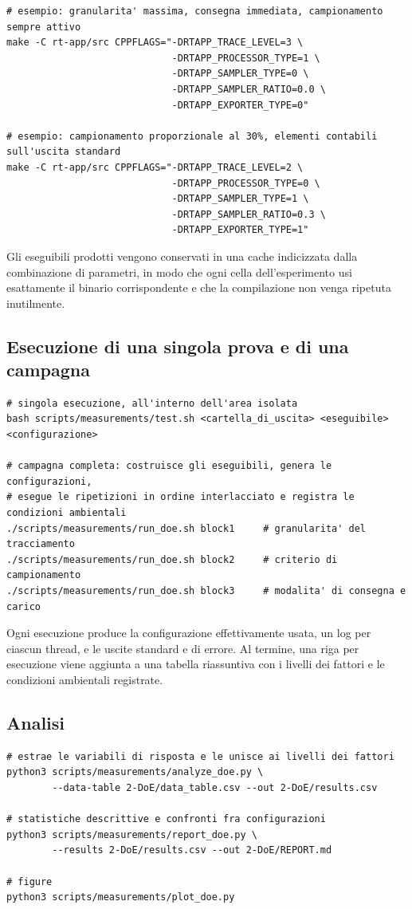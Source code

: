 \begin{lstlisting}
# esempio: granularita' massima, consegna immediata, campionamento sempre attivo
make -C rt-app/src CPPFLAGS="-DRTAPP_TRACE_LEVEL=3 \
                             -DRTAPP_PROCESSOR_TYPE=1 \
                             -DRTAPP_SAMPLER_TYPE=0 \
                             -DRTAPP_SAMPLER_RATIO=0.0 \
                             -DRTAPP_EXPORTER_TYPE=0"

# esempio: campionamento proporzionale al 30%, elementi contabili sull'uscita standard
make -C rt-app/src CPPFLAGS="-DRTAPP_TRACE_LEVEL=2 \
                             -DRTAPP_PROCESSOR_TYPE=0 \
                             -DRTAPP_SAMPLER_TYPE=1 \
                             -DRTAPP_SAMPLER_RATIO=0.3 \
                             -DRTAPP_EXPORTER_TYPE=1"
\end{lstlisting}

Gli eseguibili prodotti vengono conservati in una cache indicizzata dalla combinazione di
parametri, in modo che ogni cella dell'esperimento usi esattamente il binario corrispondente e che
la compilazione non venga ripetuta inutilmente.

\subsection{Esecuzione di una singola prova e di una campagna}

\begin{lstlisting}
# singola esecuzione, all'interno dell'area isolata
bash scripts/measurements/test.sh <cartella_di_uscita> <eseguibile> <configurazione>

# campagna completa: costruisce gli eseguibili, genera le configurazioni,
# esegue le ripetizioni in ordine interlacciato e registra le condizioni ambientali
./scripts/measurements/run_doe.sh block1     # granularita' del tracciamento
./scripts/measurements/run_doe.sh block2     # criterio di campionamento
./scripts/measurements/run_doe.sh block3     # modalita' di consegna e carico
\end{lstlisting}

Ogni esecuzione produce la configurazione effettivamente usata, un log per ciascun thread, e le
uscite standard e di errore. Al termine, una riga per esecuzione viene aggiunta a una tabella
riassuntiva con i livelli dei fattori e le condizioni ambientali registrate.

\subsection{Analisi}

\begin{lstlisting}
# estrae le variabili di risposta e le unisce ai livelli dei fattori
python3 scripts/measurements/analyze_doe.py \
        --data-table 2-DoE/data_table.csv --out 2-DoE/results.csv

# statistiche descrittive e confronti fra configurazioni
python3 scripts/measurements/report_doe.py \
        --results 2-DoE/results.csv --out 2-DoE/REPORT.md

# figure
python3 scripts/measurements/plot_doe.py
\end{lstlisting}
